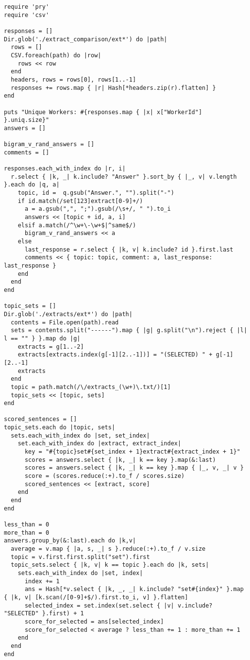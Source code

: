 \documentclass{article}
\begin{document}
\begin{verbatim}
require 'pry'
require 'csv'

responses = []
Dir.glob('./extract_comparison/ext*') do |path|
  rows = []
  CSV.foreach(path) do |row|
    rows << row
  end
  headers, rows = rows[0], rows[1..-1]
  responses += rows.map { |r| Hash[*headers.zip(r).flatten] }
end

puts "Unique Workers: #{responses.map { |x| x["WorkerId"] }.uniq.size}"
answers = []

bigram_v_rand_answers = []
comments = []

responses.each_with_index do |r, i|
  r.select { |k, _| k.include? "Answer" }.sort_by { |_, v| v.length }.each do |q, a|
    topic, id =  q.gsub("Answer.", "").split("-")
    if id.match(/set[123]extract[0-9]+/)
      a = a.gsub(",", ";").gsub(/\s+/, " ").to_i
      answers << [topic + id, a, i]
    elsif a.match(/^\w+\-\w+$|^same$/)
      bigram_v_rand_answers << a
    else
      last_response = r.select { |k, v| k.include? id }.first.last
      comments << { topic: topic, comment: a, last_response: last_response }
    end
  end
end

topic_sets = []
Dir.glob('./extracts/ext*') do |path|
  contents = File.open(path).read
  sets = contents.split("------").map { |g| g.split("\n").reject { |l| l == "" } }.map do |g|
    extracts = g[1..-2]
    extracts[extracts.index(g[-1][2..-1])] = "(SELECTED) " + g[-1][2..-1]
    extracts
  end
  topic = path.match(/\/extracts_(\w+)\.txt/)[1]
  topic_sets << [topic, sets]
end

scored_sentences = []
topic_sets.each do |topic, sets|
  sets.each_with_index do |set, set_index|
    set.each_with_index do |extract, extract_index|
      key = "#{topic}set#{set_index + 1}extract#{extract_index + 1}"
      scores = answers.select { |k, _| k == key }.map(&:last)
      scores = answers.select { |k, _| k == key }.map { |_, v, _| v }
      score = (scores.reduce(:+).to_f / scores.size)
      scored_sentences << [extract, score]
    end
  end
end

less_than = 0
more_than = 0
answers.group_by(&:last).each do |k,v|
  average = v.map { |a, s, _| s }.reduce(:+).to_f / v.size
  topic = v.first.first.split("set").first
  topic_sets.select { |k, v| k == topic }.each do |k, sets|
    sets.each_with_index do |set, index|
      index += 1
      ans = Hash[*v.select { |k, _, _| k.include? "set#{index}" }.map { |k, v| [k.scan(/[0-9]+$/).first.to_i, v] }.flatten]
      selected_index = set.index(set.select { |v| v.include? "SELECTED" }.first) + 1
      score_for_selected = ans[selected_index]
      score_for_selected < average ? less_than += 1 : more_than += 1
    end
  end
end


\end{verbatim}
\end{document}
